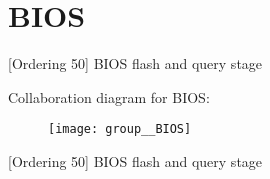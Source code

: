 \hypertarget{group__BIOS}{\section{B\-I\-O\-S}
\label{group__BIOS}
}


\mbox{[}Ordering 50\mbox{]} B\-I\-O\-S flash and query stage  


Collaboration diagram for B\-I\-O\-S\-:\nopagebreak
\begin{figure}[H]
\begin{center}
\leavevmode
\texttt{[image: group\_\_BIOS]}
\end{center}
\end{figure}
\mbox{[}Ordering 50\mbox{]} B\-I\-O\-S flash and query stage 